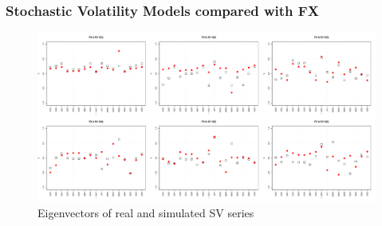 \documentclass{beamer}
\begin{document}
\begin{frame}
  \frametitle{Stochastic Volatility Models compared with FX}
  \begin{figure}[htb!]
    \centering
    \includegraphics[width=1.0\linewidth]{FX_sv_eigenvectors.pdf}
    \caption{\scriptsize Eigenvectors of real and simulated SV series}
  \end{figure}
\end{frame}
\end{document}
